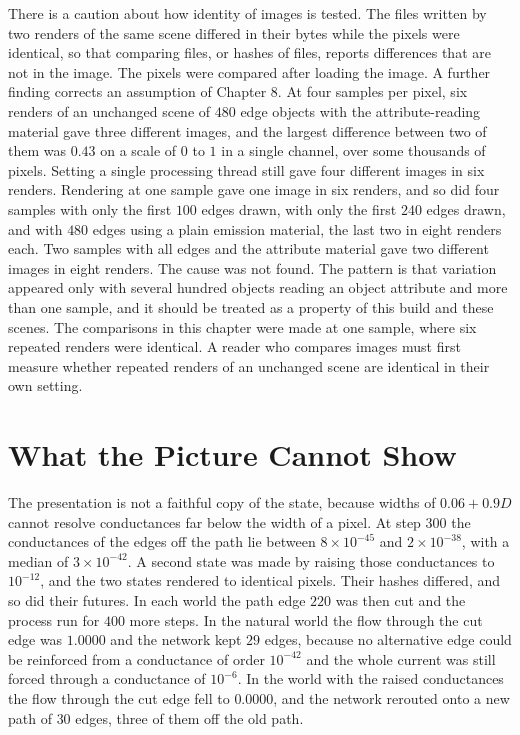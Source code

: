 There is a caution about how identity of images is tested. The files written by two renders of the same scene differed in their bytes while the pixels were identical, so that comparing files, or hashes of files, reports differences that are not in the image. The pixels were compared after loading the image. A further finding corrects an assumption of Chapter 8. At four samples per pixel, six renders of an unchanged scene of $480$ edge objects with the attribute-reading material gave three different images, and the largest difference between two of them was $0.43$ on a scale of $0$ to $1$ in a single channel, over some thousands of pixels. Setting a single processing thread still gave four different images in six renders. Rendering at one sample gave one image in six renders, and so did four samples with only the first $100$ edges drawn, with only the first $240$ edges drawn, and with $480$ edges using a plain emission material, the last two in eight renders each. Two samples with all edges and the attribute material gave two different images in eight renders. The cause was not found. The pattern is that variation appeared only with several hundred objects reading an object attribute and more than one sample, and it should be treated as a property of this build and these scenes. The comparisons in this chapter were made at one sample, where six repeated renders were identical. A reader who compares images must first measure whether repeated renders of an unchanged scene are identical in their own setting.

\section{What the Picture Cannot Show}

The presentation is not a faithful copy of the state, because widths of $0.06+0.9D$ cannot resolve conductances far below the width of a pixel. At step $300$ the conductances of the edges off the path lie between $8\times10^{-45}$ and $2\times10^{-38}$, with a median of $3\times10^{-42}$. A second state was made by raising those conductances to $10^{-12}$, and the two states rendered to identical pixels. Their hashes differed, and so did their futures. In each world the path edge $220$ was then cut and the process run for $400$ more steps. In the natural world the flow through the cut edge was $1.0000$ and the network kept $29$ edges, because no alternative edge could be reinforced from a conductance of order $10^{-42}$ and the whole current was still forced through a conductance of $10^{-6}$. In the world with the raised conductances the flow through the cut edge fell to $0.0000$, and the network rerouted onto a new path of $30$ edges, three of them off the old path.

